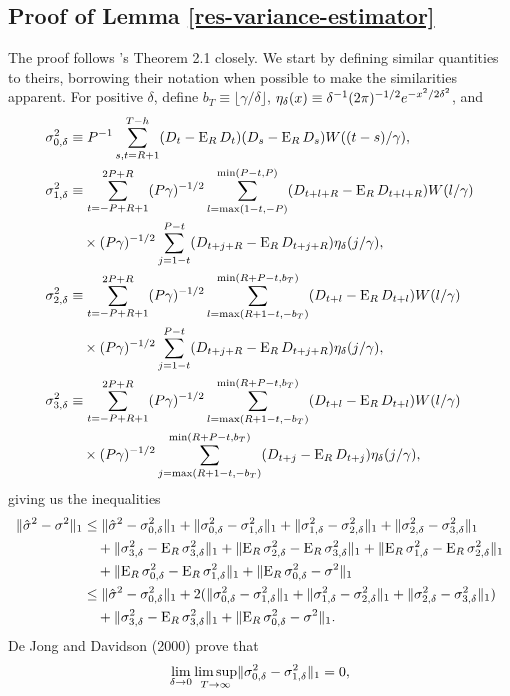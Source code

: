\documentclass[11pt]{article}
\newcommand{\citepos}[1]{\citeauthor{#1}'s \citeyearpar{#1}}
\begin{document}
\subsection*{Proof of Lemma \ref{res-variance-estimator}}
The proof follows \citepos{JoD:00} Theorem 2.1 closely.  We
start by defining similar quantities to theirs, borrowing their
notation when possible to make the similarities apparent.  For
positive $\delta$, define $b_T \equiv \lfloor \gamma/\delta \rfloor$,
$\kernelB{x} \equiv \kernelBDefn{x}$, and
\begin{align*}
  \varianceTermI &\equiv
  \varianceTermIDefn,\\ \varianceTermII &\equiv \vtSum
  \varianceTermIIa\\& \quad \times \varianceTermIIb,\\
  \varianceTermIII &\equiv \vtSum \varianceTermIIIa\\
  &\quad \times \varianceTermIIb,\\
  \varianceTermIV &\equiv \vtSum \varianceTermIIIa \\
  &\quad\times \varianceTermIVb,
\end{align*}
giving us the inequalities
\begin{align*}
  \lVert \sh^2 - \sigma^2 \rVert_1 &
  \leq \lVert \sh^2 - \varianceTermI \rVert_1
  + \lVert \varianceTermI - \varianceTermII \rVert_1
  + \lVert \varianceTermII - \varianceTermIII \rVert_1
  + \lVert \varianceTermIII - \varianceTermIV \rVert_1\\ & \quad
  + \lVert \varianceTermIV - \E_R \varianceTermIV \rVert_1
  + \lVert \E_R\varianceTermIII - \E_R\varianceTermIV \rVert_1
  + \lVert \E_R\varianceTermII - \E_R\varianceTermIII \rVert_1\\ & \quad
  + \lVert \E_R\varianceTermI - \E_R\varianceTermII \rVert_1
  + \lVert \E_R \varianceTermI - \sigma^2 \rVert_1
  \\ &
  \leq  \lVert \sh^2 - \varianceTermI \rVert_1
  + 2(\lVert \varianceTermI - \varianceTermII \rVert_1
      + \lVert \varianceTermII - \varianceTermIII \rVert_1
      + \lVert \varianceTermIII - \varianceTermIV \rVert_1) \\
  & \quad + \lVert \varianceTermIV - \E_R \varianceTermIV \rVert_1
  + \lVert \E_R \varianceTermI - \sigma^2 \rVert_1.
\end{align*}
De Jong and Davidson (2000) prove that
\begin{equation} \label{dd1}
\lim_{\delta\to0} \limsup_{T\to\infty} \lVert \varianceTermI -
\varianceTermII\rVert_1 = 0,
\end{equation}
\end{document}
